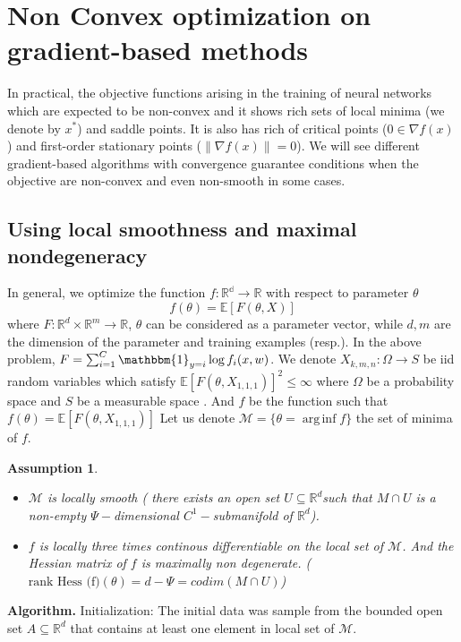 \documentclass{article}
\DeclareMathOperator*{\arginf}{arg\,inf}
\theoremstyle{theorem}
\newtheorem*{assumption}{Assumption}
\theoremstyle{definition}
\begin{document}
	\section{Non Convex optimization on gradient-based methods}
	In practical, the objective functions arising in
	the training of neural networks which are expected to be non-convex and it shows rich sets of local minima (we denote by $x^{*}$) and saddle points. It is also has rich of critical points ($0 \in \nabla f(x)$) and first-order stationary points ($\left\|\nabla f(x)\right\|=0$). We will see different gradient-based algorithms with convergence guarantee conditions when the objective are non-convex and even non-smooth in some cases.
	\subsection{Using local smoothness and maximal nondegeneracy}
	In general, we optimize the function $f: \mathbb{R^d} \to \mathbb{R}$ with respect to parameter $\theta$ $$f(\theta)=\mathbb{E}[F(\theta,X)]$$ where $F: \mathbb{R}^d \times \mathbb{R}^m \to \mathbb{R}$, $\theta$ can be considered as a parameter vector, while $d,m$ are the dimension of the parameter and training examples (resp.). In the above problem, $F = \sum_{i=1}^C \mathbbm{1}_{y=i} \log  f_i(x,w)$.  We denote $X_{k,m,n}: \Omega \to S$ be iid random variables which satisfy $\mathbb{E} \left[F(\theta, X_{1,1,1})\right]^2 \leq \infty$ where $\Omega$ be a probability space and $S$ be a measurable space . And $f$ be the function such that $f(\theta)=\mathbb{E} \left[F(\theta, X_{1,1,1})\right]$ Let us denote $\mathcal{M} = \{\theta = \arginf f\}$ the set of minima of $f$. 
	\begin{assumption}
	\begin{itemize}
		\item $\mathcal{M}$ is locally smooth ( there exists an open set $U \subseteq \mathbb{R}^d$such that $M \cap U$ is a non-empty $\Psi-$dimensional $C^1-$submanifold of $\mathbb{R}^d$).
		\item $f$ is locally three times continous differentiable on the local set of $\mathcal{M}$. And the Hessian matrix of $f$ is maximally non degenerate. ($\text{rank Hess (f)} ( \theta )=  d - \Psi = codim (M \cap U)$)
	\end{itemize}
\end{assumption}
\textbf{Algorithm.} Initialization:
The initial data was sample from the bounded open set $A \subseteq \mathbb{R}^d$ that contains at least one element in local set of $\mathcal{M}$.
\end{document}
